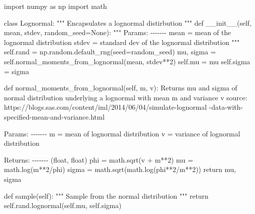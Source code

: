 \documentclass[
  letterpaper,
  DIV=11,
  numbers=noendperiod]{scrreprt}
\newenvironment{Shaded}{}{}
\newcommand{\CommentTok}[1]{\textcolor[rgb]{0.42,0.45,0.49}{#1}}
\newcommand{\ControlFlowTok}[1]{\textcolor[rgb]{0.84,0.23,0.29}{#1}}
\newcommand{\DecValTok}[1]{\textcolor[rgb]{0.00,0.36,0.77}{#1}}
\newcommand{\FunctionTok}[1]{\textcolor[rgb]{0.44,0.26,0.76}{#1}}
\newcommand{\ImportTok}[1]{\textcolor[rgb]{0.01,0.18,0.38}{#1}}
\newcommand{\KeywordTok}[1]{\textcolor[rgb]{0.84,0.23,0.29}{#1}}
\newcommand{\NormalTok}[1]{\textcolor[rgb]{0.14,0.16,0.18}{#1}}
\newcommand{\OperatorTok}[1]{\textcolor[rgb]{0.14,0.16,0.18}{#1}}
\newcommand{\VariableTok}[1]{\textcolor[rgb]{0.89,0.38,0.04}{#1}}
\begin{document}
\begin{Shaded}
\begin{Highlighting}[]
\ImportTok{import}\NormalTok{ numpy }\ImportTok{as}\NormalTok{ np}
\ImportTok{import}\NormalTok{ math}

\KeywordTok{class}\NormalTok{ Lognormal:}
    \CommentTok{"""}
\CommentTok{    Encapsulates a lognormal distirbution}
\CommentTok{    """}
    \KeywordTok{def} \FunctionTok{\_\_init\_\_}\NormalTok{(}\VariableTok{self}\NormalTok{, mean, stdev, random\_seed}\OperatorTok{=}\VariableTok{None}\NormalTok{):}
        \CommentTok{"""}
\CommentTok{        Params:}
\CommentTok{        {-}{-}{-}{-}{-}{-}{-}}
\CommentTok{        mean = mean of the lognormal distribution}
\CommentTok{        stdev = standard dev of the lognormal distribution}
\CommentTok{        """}
        \VariableTok{self}\NormalTok{.rand }\OperatorTok{=}\NormalTok{ np.random.default\_rng(seed}\OperatorTok{=}\NormalTok{random\_seed)}
\NormalTok{        mu, sigma }\OperatorTok{=} \VariableTok{self}\NormalTok{.normal\_moments\_from\_lognormal(mean, stdev}\OperatorTok{**}\DecValTok{2}\NormalTok{)}
        \VariableTok{self}\NormalTok{.mu }\OperatorTok{=}\NormalTok{ mu}
        \VariableTok{self}\NormalTok{.sigma }\OperatorTok{=}\NormalTok{ sigma}

    \KeywordTok{def}\NormalTok{ normal\_moments\_from\_lognormal(}\VariableTok{self}\NormalTok{, m, v):}
        \CommentTok{\textquotesingle{}\textquotesingle{}\textquotesingle{}}
\CommentTok{        Returns mu and sigma of normal distribution}
\CommentTok{        underlying a lognormal with mean m and variance v}
\CommentTok{        source: https://blogs.sas.com/content/iml/2014/06/04/simulate{-}lognormal}
\CommentTok{        {-}data{-}with{-}specified{-}mean{-}and{-}variance.html}

\CommentTok{        Params:}
\CommentTok{        {-}{-}{-}{-}{-}{-}{-}}
\CommentTok{        m = mean of lognormal distribution}
\CommentTok{        v = variance of lognormal distribution}

\CommentTok{        Returns:}
\CommentTok{        {-}{-}{-}{-}{-}{-}{-}}
\CommentTok{        (float, float)}
\CommentTok{        \textquotesingle{}\textquotesingle{}\textquotesingle{}}
\NormalTok{        phi }\OperatorTok{=}\NormalTok{ math.sqrt(v }\OperatorTok{+}\NormalTok{ m}\OperatorTok{**}\DecValTok{2}\NormalTok{)}
\NormalTok{        mu }\OperatorTok{=}\NormalTok{ math.log(m}\OperatorTok{**}\DecValTok{2}\OperatorTok{/}\NormalTok{phi)}
\NormalTok{        sigma }\OperatorTok{=}\NormalTok{ math.sqrt(math.log(phi}\OperatorTok{**}\DecValTok{2}\OperatorTok{/}\NormalTok{m}\OperatorTok{**}\DecValTok{2}\NormalTok{))}
        \ControlFlowTok{return}\NormalTok{ mu, sigma}

    \KeywordTok{def}\NormalTok{ sample(}\VariableTok{self}\NormalTok{):}
        \CommentTok{"""}
\CommentTok{        Sample from the normal distribution}
\CommentTok{        """}
        \ControlFlowTok{return} \VariableTok{self}\NormalTok{.rand.lognormal(}\VariableTok{self}\NormalTok{.mu, }\VariableTok{self}\NormalTok{.sigma)}
\end{Highlighting}
\end{Shaded}
\end{document}
